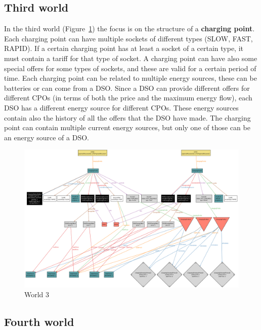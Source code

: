 \documentclass{Configuration_Files/PoliMi3i_thesis}
\begin{document}
\subsection{Third world}

In the third world (Figure~\ref{fig:world3}) the focus is on the structure of a \textbf{charging point}. Each charging point can have multiple sockets of different types (SLOW, FAST, RAPID). If a certain charging point has at least a socket of a certain type, it must contain a tariff for that type of socket. A charging point can have also some special offers for some types of sockets, and these are valid for a certain period of time. Each charging point can be related to multiple energy sources, these can be batteries or can come from a DSO. Since a DSO can provide different offers for different CPOs (in terms of both the price and the maximum energy flow), each DSO has a different energy source for different CPOs. These energy sources contain also the history of all the offers that the DSO have made. The charging point can contain multiple current energy sources, but only one of those can be an energy source of a DSO.

\begin{figure}[H]
    \centering
    \includegraphics[width=1\textwidth]{Images/alloy/world3.png}
    \caption{World 3}
    \label{fig:world3}
\end{figure}

\subsection{Fourth world}
\end{document}
